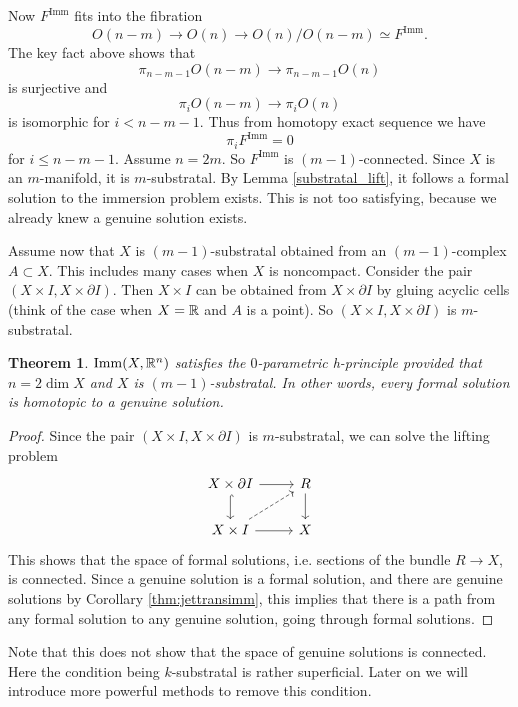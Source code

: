 \documentclass{article}
\newtheorem{theorem}{Theorem}[section]
\newtheorem{proposed work}[theorem]{Proposed Work}
\DeclareMathOperator{\Imm}{Imm}
\begin{document}
Now $F^{\Imm}$ fits into the fibration
\begin{equation*}
O(n-m)\to O(n) \to O(n)/O(n-m) \simeq F^{\Imm}.
\end{equation*}
The key fact above shows that
\begin{equation*}
\pi_{n-m-1}O(n-m)\to\pi_{n-m-1}O(n)
\end{equation*}
is surjective and
\begin{equation*}
\pi_{i}O(n-m)\to\pi_{i}O(n)
\end{equation*}
is isomorphic for $i < n-m-1$. Thus from homotopy exact sequence we have
\begin{equation*}
\pi_iF^{\Imm} = 0
\end{equation*}
for $i \le n-m-1$. Assume $n=2m$. So $F^{\Imm}$ is $(m-1)$-connected. Since $X$ is an $m$-manifold, it is $m$-substratal. By Lemma \ref{substratal_lift}, it follows a formal solution to the immersion problem exists. This is not too satisfying, because we already knew a genuine solution exists.

Assume now that $X$ is $(m-1)$-substratal obtained from an $(m-1)$-complex $A \subset X$. This includes many cases when $X$ is noncompact. Consider the pair $(X\times I, X\times \partial I)$. Then $X\times I$ can be obtained from $X\times\partial I$ by gluing acyclic cells (think of the case when $X=\mathbb R$ and $A$ is a point). So $(X\times I, X\times \partial I)$ is $m$-substratal.

\begin{theorem}
$\Imm(X,\R^n)$ satisfies the $0$-parametric h-principle provided that $n=2\dim X$ and $X$ is $(m-1)$-substratal. In other words, every formal solution is homotopic to a genuine solution.
\end{theorem}

\begin{proof}
Since the pair $(X\times I, X\times \partial I)$ is $m$-substratal, we can solve the lifting problem
\begin{equation*}
\begin{tikzcd}
X\times\partial I \arrow[r] \arrow[hookrightarrow]{d}
& R \arrow[d]
\\
X \times I \arrow[r] \arrow[dashed,ur]
& X
\end{tikzcd}
\end{equation*}
This shows that the space of formal solutions, i.e. sections of the bundle $R \to X$, is connected.  Since a genuine solution is a formal solution, and there are genuine solutions by Corollary \ref{thm:jettransimm}, this implies that there is a path from any formal solution to any genuine solution, going through formal solutions.
\end{proof}
Note that this does not show that the space of genuine solutions is connected. Here the condition being $k$-substratal is rather superficial. Later on we will introduce more powerful methods to remove this condition.
\end{document}
